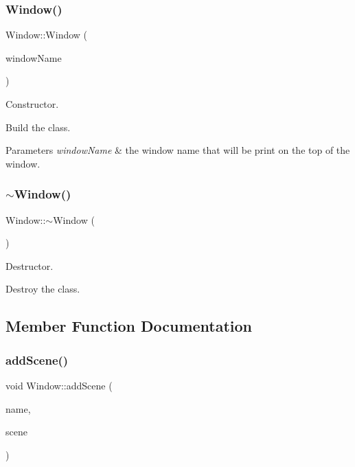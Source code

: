 \subsubsection{\texorpdfstring{Window()}{Window()}}
{\footnotesize\ttfamily Window\+::\+Window (\begin{DoxyParamCaption}\item[{const wchar\+\_\+t $\ast$}]{window\+Name }\end{DoxyParamCaption})}



Constructor. 

Build the class.


\begin{DoxyParams}{Parameters}
{\em \textquotesingle{}window\+Name\textquotesingle{}} & the window name that will be print on the top of the window. \\
\hline
\end{DoxyParams}
\mbox{\label{classWindow_a245d821e6016fa1f6970ccbbedd635f6}} 
\subsubsection{\texorpdfstring{$\sim$\+Window()}{~Window()}}
{\footnotesize\ttfamily Window\+::$\sim$\+Window (\begin{DoxyParamCaption}{ }\end{DoxyParamCaption})}



Destructor. 

Destroy the class. 

\subsection{Member Function Documentation}
\mbox{\label{classWindow_ac9150ac221e5569e677586d5a1123518}} 
\subsubsection{\texorpdfstring{add\+Scene()}{addScene()}}
{\footnotesize\ttfamily void Window\+::add\+Scene (\begin{DoxyParamCaption}\item[{const String \&}]{name,  }\item[{const std\+::shared\+\_\+ptr$<$ \hyperlink{classAScene}{A\+Scene} $>$ \&}]{scene }\end{DoxyParamCaption})}



